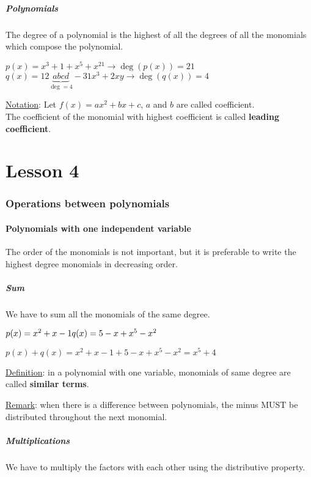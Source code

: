 \documentclass{article}
\newcommand{\figbox}[1]{ 
    \begin{figure*}[ht!]        
        \begin{center}            
            \fbox{#1}        
        \end{center}    
    \end{figure*}
}
\begin{document}
\subsubsection{Polynomials}
The degree of a polynomial is the highest of all the degrees of all the
monomials which compose the polynomial.

$p(x)=x^3+1+x^5+x^21 \rightarrow \deg(p(x))=21$\\
$q(x)=12 \underbrace{abcd}_{\deg=4} - 31x^3+2xy \rightarrow \deg(q(x))=4$ 

\underline{Notation}: Let $f(x)=ax^2+bx+c$, $a$ and $b$ are called coefficient.\\
The coefficient of the monomial with highest coefficient is called \textbf{leading coefficient}.

\newpage
\part{Lesson 4}
\section{Operations between polynomials}
\subsection{Polynomials with one independent variable}
The order of the monomials is not important, but it is preferable to write
the highest degree monomials in decreasing order.
\figbox{$p(x)=ax^2-bx+c$}

\subsubsection{Sum}
We have to sum all the monomials of the same degree.

$p(x)=x^2+x-1\\
q(x)=5-x+x^5-x^2$

$p(x)+q(x)=x^2+x-1+5-x+x^5-x^2=x^5+4$

\underline{Definition}: in a polynomial with one variable, monomials of same
degree are called \textbf{similar terms}.

\underline{Remark}: when there is a difference between polynomials, the minus MUST be distributed throughout the next monomial.

\subsubsection{Multiplications}
We have to multiply the factors with each other using the distributive property.
\end{document}
